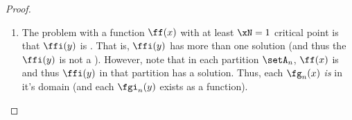 \begin{proof}
\begin{enumerate}
  \item \label{item:YfX_gn}
        The problem with a function $\ff(x)$ with at least $\xN=1$ critical point is that
        $\ffi(y)$ is .
        That is,
        $\ffi(y)$ has more than one solution (and thus the  $\ffi(y)$ is not a ).
        However, note that in each partition $\setA_n$, $\ff(x)$ is  and thus
        $\ffi(y)$ in that partition has a  solution.
        Thus, each $\fg_n(x)$ \emph{is}  in it's domain (and each $\fgi_n(y)$ exists as a function).



\end{enumerate}
\end{proof}

